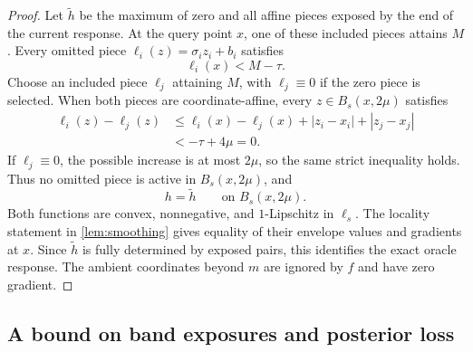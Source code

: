 \documentclass[11pt]{article}
\newcommand{\abs}[1]{\left|#1\right|}
\theoremstyle{definition}
\theoremstyle{remark}
\begin{document}
\begin{proof}
Let $\widetilde h$ be the maximum of zero and all affine pieces exposed
by the end of the current response.  At the query point $x$, one of
these included pieces attains $M$.  Every omitted piece
$\ell_i(z)=\sigma_i z_i+b_i$ satisfies
\[
 \ell_i(x)<M-\tau.
\]
Choose an included piece $\ell_j$ attaining $M$, with
$\ell_j\equiv0$ if the zero piece is selected.  When both pieces are
coordinate-affine, every $z\in B_s(x,2\mu)$ satisfies
\begin{align*}
 \ell_i(z)-\ell_j(z)
 &\le\ell_i(x)-\ell_j(x)
       +\abs{z_i-x_i}+\abs{z_j-x_j}\\
 &< -\tau+4\mu=0.
\end{align*}
If $\ell_j\equiv0$, the possible increase is at most $2\mu$, so the
same strict inequality holds.  Thus no omitted piece is active in
$B_s(x,2\mu)$, and
\[
 h=\widetilde h\qquad\text{on }B_s(x,2\mu).
\]
Both functions are convex, nonnegative, and $1$-Lipschitz in $\ell_s$.
The locality statement in \cref{lem:smoothing} gives equality of their
envelope values and gradients at $x$.  Since $\widetilde h$ is fully
determined by exposed pairs, this identifies the exact oracle response.
The ambient coordinates beyond $m$ are ignored by $f$ and have zero
gradient.
\end{proof}

\subsection{A bound on band exposures and posterior loss}
\end{document}
